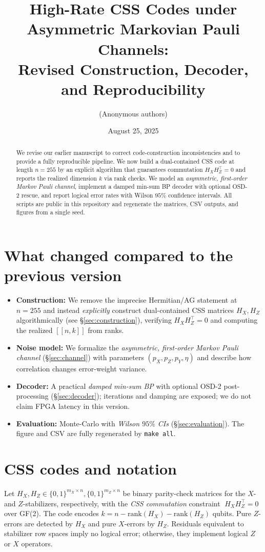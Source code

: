 \documentclass[11pt]{article}
\title{High-Rate CSS Codes under Asymmetric Markovian Pauli Channels:\\
Revised Construction, Decoder, and Reproducibility}
\author{%
  (Anonymous authors)%
}
\date{August 25, 2025}
\begin{document}
\maketitle

\begin{abstract}
We revise our earlier manuscript to correct code-construction inconsistencies
and to provide a fully reproducible pipeline. We now build a dual-contained
CSS code at length \(n=255\) by an explicit algorithm that guarantees
commutation \(H_X H_Z^\top = 0\) and reports the realized dimension \(k\)
via rank checks. We model an \emph{asymmetric, first-order Markov Pauli
channel}, implement a damped min-sum BP decoder with optional OSD-2 rescue,
and report logical error rates with Wilson \(95\%\) confidence intervals.
All scripts are public in this repository and regenerate the matrices,
CSV outputs, and figures from a single seed.
\end{abstract}

\section*{What changed compared to the previous version}
\begin{itemize}
  \item \textbf{Construction:} We remove the imprecise Hermitian/AG statement
        at \(n=255\) and instead \emph{explicitly} construct dual-contained CSS
        matrices \(H_X,H_Z\) algorithmically (see \S\ref{sec:construction}),
        verifying \(H_X H_Z^\top\!=\!0\) and computing the realized
        \([ [n,k] ]\) from ranks.
  \item \textbf{Noise model:} We formalize the \emph{asymmetric,
        first-order Markov Pauli channel} (\S\ref{sec:channel}) with
        parameters \((p_X,p_Z,p_Y,\eta)\) and describe how correlation changes
        error-weight variance.
  \item \textbf{Decoder:} A practical \emph{damped min-sum BP} with
        optional OSD-2 post-processing (\S\ref{sec:decoder}); iterations and
        damping are exposed; we do not claim FPGA latency in this version.
  \item \textbf{Evaluation:} Monte-Carlo with \emph{Wilson \(95\%\) CIs}
        (\S\ref{sec:evaluation}). The figure and CSV are fully regenerated by
        \texttt{make all}.
\end{itemize}

\section{CSS codes and notation}
Let \(H_X,H_Z\in\{0,1\}^{m_X\times n}, \{0,1\}^{m_Z\times n}\) be binary
parity-check matrices for the \(X\)- and \(Z\)-stabilizers, respectively,
with the \emph{CSS commutation} constraint
\(\;H_X H_Z^\top = 0\;\) over GF(2).
The code encodes \(k = n - \mathrm{rank}(H_X) - \mathrm{rank}(H_Z)\) qubits.
Pure \(Z\)-errors are detected by \(H_X\) and pure \(X\)-errors by \(H_Z\).
Residuals equivalent to stabilizer row spaces imply no logical error; otherwise,
they implement logical \(Z\) or \(X\) operators.
\end{document}
